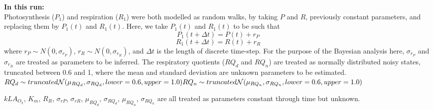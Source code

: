 \documentclass{ruthesis}
\begin{document}
\textbf{In this run:}\\
Photosynthesis ($P_1$) and respiration ($R_1$) were both modelled as random walks, by taking \begin{math}P\end{math} and \begin{math}R\end{math}, previously constant parameters, and replacing them by \begin{math}P_1(t)\end{math} and \begin{math}R_1(t)\end{math}. Here, we take \begin{math}P_1(t)\end{math} and \begin{math}R_1(t)\end{math} to be such that
\begin{displaymath}
P_1(t+\Delta t) = P(t) + r_P
\end{displaymath}
\begin{displaymath}
R_1(t+\Delta t) = R(t) + r_R
\end{displaymath}
where \begin{math}
r_P \sim N(0, \sigma_{r_P})
\end{math}, \begin{math}
r_R \sim N(0, \sigma_{r_R})
\end{math}, and \begin{math}
\Delta t
\end{math} is the length of discrete time-step. For the purpose of the Bayesian analysis here, \begin{math}\sigma_{r_P}\end{math} and \begin{math}\sigma_{r_R}\end{math} are treated as parameters to be inferred.  
The respiratory quotients ($RQ_d$ and $RQ_n$) are treated as normally distributed noisy states, truncated between 0.6 and 1, where the mean and standard deviation are unknown parameters to be estimated. \\
$
RQ_d \sim truncated\mathcal{N}(\mu_{RQ_d}, \sigma_{RQ_d}, lower = 0.6, upper = 1.0) \\
RQ_n \sim truncated\mathcal{N}(\mu_{RQ_n}, \sigma_{RQ_n}, lower = 0.6, upper = 1.0) \\ $

$kLA_{O_2}$, $K_m$, $R_R$, $\sigma_{rP}$, $\sigma_{rR}$, $\mu_{RQ_d}$, $\sigma_{RQ_d}$, $\mu_{RQ_n}$, $\sigma_{RQ_n}$ are all treated as parameters constant through time but unknown. 
\end{document}
